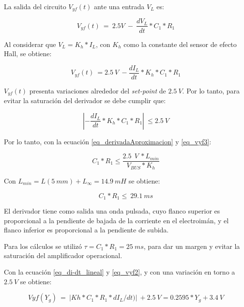 \noindent La salida del circuito $V_{yf}(t)$ ante una entrada $V_L$ es:

\begin{equation} \label{eq_vyf1}
	V_{yf}(t)\ =\ 2.5V\ -\ \frac{dV_L}{dt}*C_1*R_1
\end{equation}


\noindent Al considerar que $V_L=K_h*I_L$, con $K_h$ como la constante del sensor de efecto Hall, se obtiene: 

\begin{equation} \label{eq_vyf2}
	V_{yf}(t)\ =2.5\:V\ -\frac{dI_L}{dt}*K_h*C_1*R_1
\end{equation}

\noindent $V_{yf}(t)$ presenta variaciones alrededor del \textsl{set-point} de $2.5\:V$. Por lo tanto, para evitar la saturaci\'{o}n del derivador se debe cumplir que:

\begin{equation} \label{eq_vyf3}
	\left|-\frac{dI_L}{dt}*K_h*C_1*R_1\right|\ \le 2.5\:V
\end{equation}

\noindent Por lo tanto, con la ecuaci\'{o}n \ref{eq_derivadaAproximacion} y \ref{eq_vyf3}:

\begin{equation} \label{eq_condicionC1-R1}
	C_1*R_1\le\frac{2.5\ \:V\ *L_{min}}{V_{BUS}*K_h}
\end{equation}

\noindent Con $L_{min}= L(5\: mm) + L_{\infty}= 14.9\: mH$ se obtiene: 

\begin{equation} \label{eq_condicionC1-R1-2}
	C_1*R_1\le\ 29.1\ ms
\end{equation}

\noindent El derivador tiene como salida una onda pulsada, cuyo flanco superior  es proporcional a la pendiente de bajada de la corriente en el electroim\'{a}n, y el flanco inferior es proporcional a la pendiente de subida. 

\noindent Para los c\'{a}lculos se utiliz\'{o} $\tau = C_1*R_1= 25\:ms$, para dar un margen y evitar la saturaci\'{o}n del amplificador operacional.  

\noindent Con la ecuaci\'{o}n \ref{eq_di-dt_lineal} y \ref{eq_vyf2}, y con una variaci\'{o}n en torno a $2.5\:V$ se obtiene:


\begin{equation} \label{eq_Vyf-lineal}
	Vyf(Y_g)\ =\ |Kh*C_1*R_1*dI_L/dt)|\ +2.5\:V=0.2595*Y_g+3.4\:V
\end{equation}

